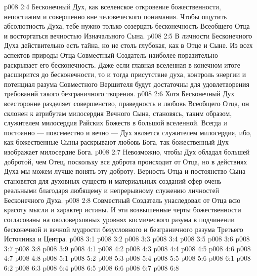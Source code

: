 \vs p008 2:4 \pc Бесконечный Дух, как вселенское откровение божественности, непостижим и совершенно вне человеческого понимания. Чтобы ощутить абсолютность Духа, тебе нужно только созерцать бесконечность Всеобщего Отца и восторгаться вечностью Изначального Сына.
\vs p008 2:5 \pc В личности Бесконечного Духа действительно есть тайна, но не столь глубокая, как в Отце и Сыне. Из всех аспектов природы Отца Совместный Создатель наиболее поразительно раскрывает его бесконечность. Даже если главная вселенная в конечном итоге расширится до бесконечности, то и тогда присутствие духа, контроль энергии и потенциал разума Совместного Вершителя будут достаточны для удовлетворения требований такого безграничного творения.
\vs p008 2:6 Хотя Бесконечный Дух всесторонне разделяет совершенство, праведность и любовь Всеобщего Отца, он склонен к атрибутам милосердия Вечного Сына, становясь, таким образом, служителем милосердия Райских Божеств в большой вселенной. Всегда и постоянно --- повсеместно и вечно --- Дух является служителем милосердия, ибо, как божественные Сыны раскрывают любовь Бога, так божественный Дух изображает милосердие Бога.
\vs p008 2:7 Невозможно, чтобы Дух обладал большей добротой, чем Отец, поскольку вся доброта происходит от Отца, но в действиях Духа мы можем лучше понять эту доброту. Верность Отца и постоянство Сына становятся для духовных существ и материальных созданий сфер очень реальными благодаря любящему и непрерывному служению личностей Бесконечного Духа.
\vs p008 2:8 Совместный Создатель унаследовал от Отца всю красоту мысли и характер истины. И эти возвышенные черты божественности согласованы на околоверховных уровнях космического разума в подчинении бесконечной и вечной мудрости безусловного и безграничного разума Третьего Источника и Центра.
\vs p008 3:1 
\vs p008 3:2 
\vs p008 3:3 
\vs p008 3:4 
\vs p008 3:5 \pc 
\vs p008 3:6 
\vs p008 3:7 
\vs p008 3:8 
\vs p008 3:9 
\vs p008 4:1 
\vs p008 4:2 
\vs p008 4:3 
\vs p008 4:4 \pc 
\vs p008 4:5 
\vs p008 4:6 
\vs p008 4:7 \pc 
\vs p008 4:8 
\vs p008 5:1 
\vs p008 5:2 
\vs p008 5:3 \pc 
\vs p008 5:4 \pc 
\vs p008 5:5 
\vs p008 5:6 
\vs p008 6:1 
\vs p008 6:2 
\vs p008 6:3 
\vs p008 6:4 
\vs p008 6:5 
\vs p008 6:6 \pc 
\vs p008 6:7 
\vsetoff
\vs p008 6:8 
\quizlink
